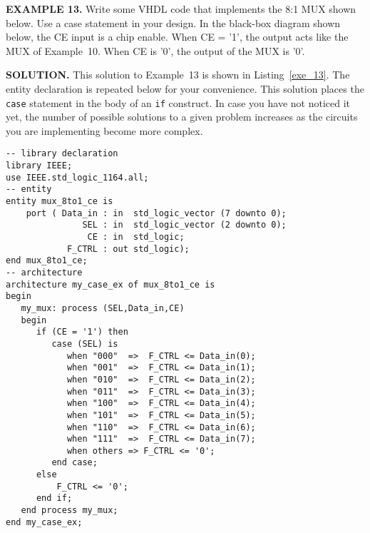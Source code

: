 \begin{leftbar}
\begin{minipage}{0.5\linewidth}
\noindent
\textbf{EXAMPLE 13.}
Write some VHDL code that implements the 8:1 MUX shown below. Use a case statement in your design. In the black-box diagram shown below, the CE input is a chip enable. When CE = '1', the output acts like the MUX of Example~10. When CE is '0', the output of the MUX is '0'.
\end{minipage}
\begin{minipage}{0.47\linewidth}
\begin{flushright}
\end{flushright}
\end{minipage}
\end{leftbar}
\noindent
\textbf{SOLUTION.} This solution to Example~13 is shown in Listing~\ref{exe_13}. The entity declaration is repeated below for your convenience. This solution places the \texttt{case} statement in the body of an \texttt{if} construct. In case you have not noticed it yet, the number of possible solutions to a given problem increases as the circuits you are implementing become more complex.

\noindent
\begin{minipage}{0.99\linewidth}
\begin{lstlisting}[label=exe_13, caption=Solution to Example~13.]
-- library declaration
library IEEE;
use IEEE.std_logic_1164.all;
-- entity
entity mux_8to1_ce is
    port ( Data_in : in  std_logic_vector (7 downto 0);
               SEL : in  std_logic_vector (2 downto 0);
                CE : in  std_logic;
            F_CTRL : out std_logic);
end mux_8to1_ce;
-- architecture
architecture my_case_ex of mux_8to1_ce is
begin
   my_mux: process (SEL,Data_in,CE)
   begin
      if (CE = '1') then
         case (SEL) is
            when "000"  =>  F_CTRL <= Data_in(0);
            when "001"  =>  F_CTRL <= Data_in(1);
            when "010"  =>  F_CTRL <= Data_in(2);
            when "011"  =>  F_CTRL <= Data_in(3);
            when "100"  =>  F_CTRL <= Data_in(4);
            when "101"  =>  F_CTRL <= Data_in(5);
            when "110"  =>  F_CTRL <= Data_in(6);
            when "111"  =>  F_CTRL <= Data_in(7);
            when others => F_CTRL <= '0';
         end case;
      else
          F_CTRL <= '0';
      end if;
   end process my_mux;
end my_case_ex;
\end{lstlisting}
\end{minipage}

